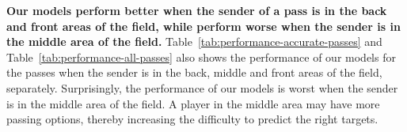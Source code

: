 \textbf{Our models perform better when the sender of a pass is in the back and front areas of the field, while perform worse when the sender is in the middle area of the field.}
Table~\ref{tab:performance-accurate-passes} and Table~\ref{tab:performance-all-passes} also shows the performance of our models for the passes when the sender is in the back, middle and front areas of the field, separately.
Surprisingly, the performance of our models is worst when the sender is in the middle area of the field. A player in the middle area may have more passing options, thereby increasing the difficulty to predict the right targets.

